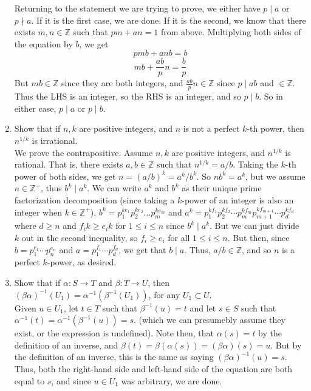 \documentclass{article}
\newcommand{\Z}{{\mathbb Z}}
\begin{document}
\begin{enumerate}
		Returning to the statement we are trying to prove,
		we either have $p \mid a$ or $p\nmid a$.
		If it is the first case, we are done.
		If it is the second,
		we know that there exists $m,n\in\Z$ such that $pm + an = 1$ from above.
		Multiplying both sides of the equation by $b$,
		we get
		\[pmb + anb = b\]
		\[mb + \frac{ab}{p}n = \frac{b}{p}\]
		But $mb \in \Z$ since they are both integers,
		and $\frac{ab}{p}n \in \Z$ since $p\mid ab$ and $\in \Z$.
		Thus the LHS is an integer,
		so the RHS is an integer,
		and so $p \mid b$.
		So in either case, $p \mid a$ or $p \mid b$.
	\item Show that if $n,k$ are positive integers,
		and $n$ is not a perfect $k$-th power,
		then $n^{1/k}$ is irrational.\\
		We prove the contrapositive.
		Assume $n,k$ are positive integers,
		and $n^{1/k}$ is rational.
		That is, there exists $a,b \in \Z$ such that $n^{1/k} = a/b$.
		Taking the $k$-th power of both sides, we get $n = (a/b)^k = a^k / b^k$.
		So $nb^k = a^k$,
		but we assume $n \in \Z^+$,
		thus $b^k \mid a^k$.
		We can write $a^k$ and $b^k$ as their unique prime factorization decomposition
		(since taking a $k$-power of an integer is also an integer when $k \in \Z^+$),
		$b^k = p_{1}^{ke_1}p_2^{ke_2}\dots p_m^{ke_m}$
		and $a^k = p_{1}^{kf_1}p_2^{kf_2}\cdots p_m^{kf_m}p_{m+1}^{kf_{m+1}}\cdots p_d^{kf_{d}}$
		where $d \geq n$ and $f_ik \geq e_ik$ for $1 \leq i \leq n$
		since $b^k \mid a^k$.
		But we can just divide $k$ out in the second inequality,
		so $f_i \geq e_i$ for all $1 \leq i \leq n$.
		But then, since $b = p_1^{e_1}\cdots p_n^{e_n}$ and $a = p_1^{f_1} \cdots p_d^{f_d}$,
		we get that $b \mid a$.
		Thus, $a/b \in \Z$,
		and so $n$ is a perfect $k$-power,
		as desired.
	\item Show that if $\alpha \colon S \to T$ and $\beta \colon T \to U$,
		then $(\beta \alpha)^{-1}(U_1) = \alpha^{-1}(\beta^{-1}(U_1))$,
		for any $U_1 \subset U$.\\
		Given $u \in U_1$,
		let $t \in T$ such that $\beta^{-1}(u) = t$
		and let $s \in S$ such that 
		$\alpha^{-1}(t) = \alpha^{-1}(\beta^{-1}(u)) = s$.
		(which we can presumebly assume they exist,
		or the expression is undefined).
		Note then, that $\alpha(s) = t$ by the definition
		of an inverse,
		and $\beta(t) = \beta(\alpha(s)) = (\beta\alpha)(s) = u$.
		But by the definition of an inverse,
		this is the same as saying $(\beta\alpha)^{-1}(u) = s$.
		Thus, both the right-hand side and left-hand side
		of the equation are both equal to $s$,
		and since $u\in U_1$ was arbitrary,
		we are done.

\end{enumerate}
\end{document}
